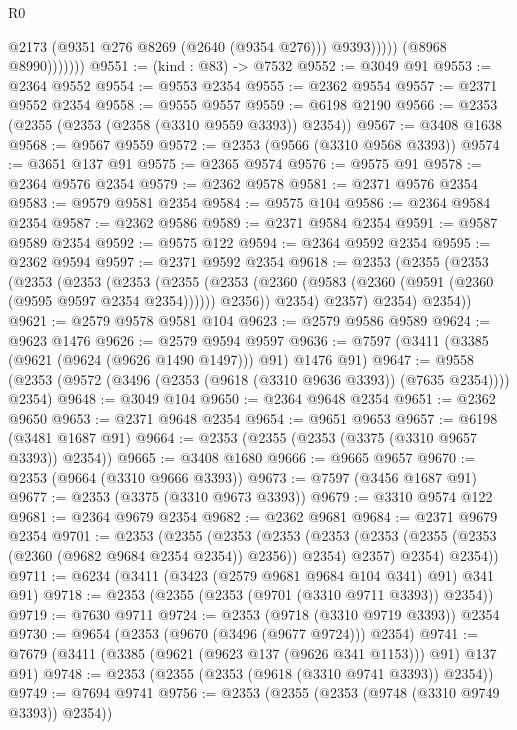 \begin{lexlean}{R0}
\begin{coremodule}
                          @2173
                          (@9351 @276 @8269 (@2640 (@9354 @276)))
                          @9393)))))
                (@8968 @8990)))))))
@9551 := (kind : @83) -> @7532
@9552 := @3049 @91
@9553 := @2364 @9552
@9554 := @9553 @2354
@9555 := @2362 @9554
@9557 := @2371 @9552 @2354
@9558 := @9555 @9557
@9559 := @6198 @2190
@9566 := @2353 (@2355 (@2353 (@2358 (@3310 @9559 @3393)) @2354))
@9567 := @3408 @1638
@9568 := @9567 @9559
@9572 := @2353 (@9566 (@3310 @9568 @3393))
@9574 := @3651 @137 @91
@9575 := @2365 @9574
@9576 := @9575 @91
@9578 := @2364 @9576 @2354
@9579 := @2362 @9578
@9581 := @2371 @9576 @2354
@9583 := @9579 @9581 @2354
@9584 := @9575 @104
@9586 := @2364 @9584 @2354
@9587 := @2362 @9586
@9589 := @2371 @9584 @2354
@9591 := @9587 @9589 @2354
@9592 := @9575 @122
@9594 := @2364 @9592 @2354
@9595 := @2362 @9594
@9597 := @2371 @9592 @2354
@9618 := @2353
    (@2355
      (@2353
        (@2353
          (@2353
            (@2353
              (@2355
                (@2353 (@2360 (@9583 (@2360 (@9591 (@2360 (@9595 @9597 @2354 @2354)))))) @2356))
              @2354)
            @2357)
          @2354)
        @2354))
@9621 := @2579 @9578 @9581 @104
@9623 := @2579 @9586 @9589
@9624 := @9623 @1476
@9626 := @2579 @9594 @9597
@9636 := @7597 (@3411 (@3385 (@9621 (@9624 (@9626 @1490 @1497))) @91) @1476 @91)
@9647 := @9558 (@2353 (@9572 (@3496 (@2353 (@9618 (@3310 @9636 @3393)) (@7635 @2354)))) @2354)
@9648 := @3049 @104
@9650 := @2364 @9648 @2354
@9651 := @2362 @9650
@9653 := @2371 @9648 @2354
@9654 := @9651 @9653
@9657 := @6198 (@3481 @1687 @91)
@9664 := @2353 (@2355 (@2353 (@3375 (@3310 @9657 @3393)) @2354))
@9665 := @3408 @1680
@9666 := @9665 @9657
@9670 := @2353 (@9664 (@3310 @9666 @3393))
@9673 := @7597 (@3456 @1687 @91)
@9677 := @2353 (@3375 (@3310 @9673 @3393))
@9679 := @3310 @9574 @122
@9681 := @2364 @9679 @2354
@9682 := @2362 @9681
@9684 := @2371 @9679 @2354
@9701 := @2353
    (@2355
      (@2353
        (@2353
          (@2353 (@2353 (@2355 (@2353 (@2360 (@9682 @9684 @2354 @2354)) @2356)) @2354) @2357)
          @2354)
        @2354))
@9711 := @6234 (@3411 (@3423 (@2579 @9681 @9684 @104 @341) @91) @341 @91)
@9718 := @2353 (@2355 (@2353 (@9701 (@3310 @9711 @3393)) @2354))
@9719 := @7630 @9711
@9724 := @2353 (@9718 (@3310 @9719 @3393)) @2354
@9730 := @9654 (@2353 (@9670 (@3496 (@9677 @9724))) @2354)
@9741 := @7679 (@3411 (@3385 (@9621 (@9623 @137 (@9626 @341 @1153))) @91) @137 @91)
@9748 := @2353 (@2355 (@2353 (@9618 (@3310 @9741 @3393)) @2354))
@9749 := @7694 @9741
@9756 := @2353 (@2355 (@2353 (@9748 (@3310 @9749 @3393)) @2354))

\end{coremodule}
\end{lexlean}
